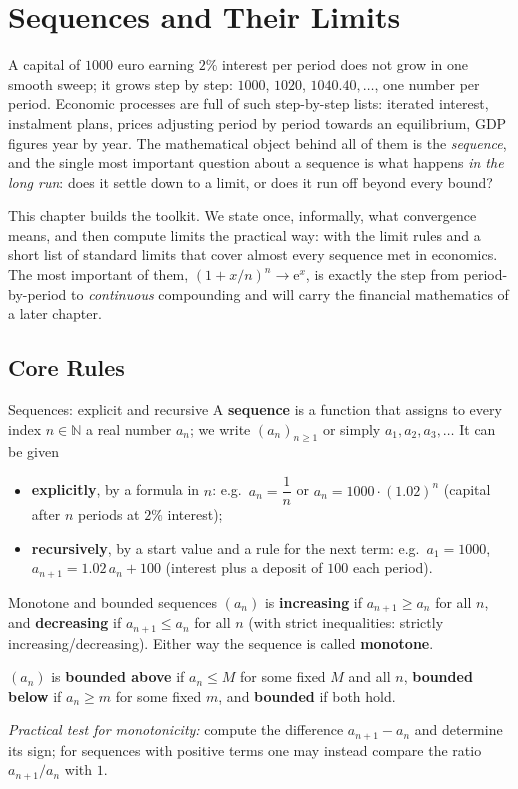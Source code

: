 \chapter{Sequences and Their Limits}

A capital of $1000$ euro earning $2\%$ interest per period does not grow in
one smooth sweep; it grows step by step: $1000$, $1020$, $1040.40,\dots$,
one number per period. Economic processes are full of such step-by-step
lists: iterated interest, instalment plans, prices adjusting period by
period towards an equilibrium, GDP figures year by year. The mathematical
object behind all of them is the \emph{sequence}, and the single most
important question about a sequence is what happens \emph{in the long run}:
does it settle down to a limit, or does it run off beyond every bound?

This chapter builds the toolkit. We state once, informally, what
convergence means, and then compute limits the practical way: with the
limit rules and a short list of standard limits that cover almost every
sequence met in economics. The most important of them, $(1+x/n)^{n}\to\mathrm{e}^{x}$,
is exactly the step from period-by-period to \emph{continuous} compounding
and will carry the financial mathematics of a later chapter.

\section{Core Rules}

\begin{rulebox}{Sequences: explicit and recursive}
A \textbf{sequence} is a function that assigns to every index
$n\in\mathbb{N}$ a real number $a_{n}$; we write $(a_{n})_{n\geq 1}$ or
simply $a_{1},a_{2},a_{3},\dots$ It can be given
\begin{itemize}[leftmargin=1.6em,itemsep=0.3ex]
  \item \textbf{explicitly}, by a formula in $n$: e.g.\ $a_{n}=\dfrac{1}{n}$
        or $a_{n}=1000\cdot(1.02)^{n}$ (capital after $n$ periods at
        $2\%$ interest);
  \item \textbf{recursively}, by a start value and a rule for the next
        term: e.g.\ $a_{1}=1000$, $a_{n+1}=1.02\,a_{n}+100$ (interest plus
        a deposit of $100$ each period).
\end{itemize}
\end{rulebox}

\begin{rulebox}{Monotone and bounded sequences}
$(a_{n})$ is \textbf{increasing} if
$a_{n+1}\geq a_{n}$ for all $n$, and \textbf{decreasing} if
$a_{n+1}\leq a_{n}$ for all $n$ (with strict inequalities: strictly
increasing/decreasing). Either way the sequence is called
\textbf{monotone}.

$(a_{n})$ is \textbf{bounded above} if $a_{n}\leq M$ for some fixed $M$ and
all $n$, \textbf{bounded below} if $a_{n}\geq m$ for some fixed $m$, and
\textbf{bounded} if both hold.

\emph{Practical test for monotonicity:} compute the difference
$a_{n+1}-a_{n}$ and determine its sign; for sequences with positive terms
one may instead compare the ratio $a_{n+1}/a_{n}$ with $1$.
\end{rulebox}

